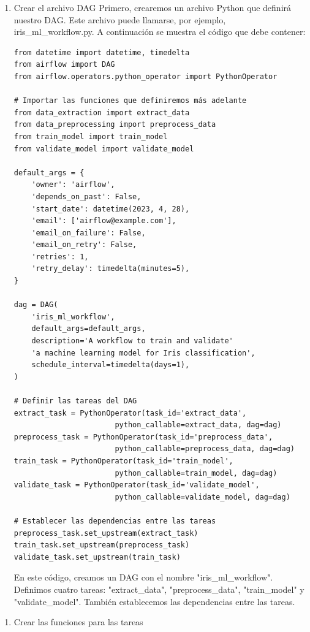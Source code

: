 \documentclass[11pt]{article}
\begin{document}
\begin{enumerate}
\item Crear el archivo DAG
Primero, crearemos un archivo Python que definirá nuestro DAG. Este
archivo puede llamarse, por ejemplo, iris\_ml\_workflow.py. A
continuación se muestra el código que debe contener:
\begin{verbatim}
from datetime import datetime, timedelta
from airflow import DAG
from airflow.operators.python_operator import PythonOperator

# Importar las funciones que definiremos más adelante
from data_extraction import extract_data
from data_preprocessing import preprocess_data
from train_model import train_model
from validate_model import validate_model

default_args = {
    'owner': 'airflow',
    'depends_on_past': False,
    'start_date': datetime(2023, 4, 28),
    'email': ['airflow@example.com'],
    'email_on_failure': False,
    'email_on_retry': False,
    'retries': 1,
    'retry_delay': timedelta(minutes=5),
}

dag = DAG(
    'iris_ml_workflow',
    default_args=default_args,
    description='A workflow to train and validate'
    'a machine learning model for Iris classification',
    schedule_interval=timedelta(days=1),
)

# Definir las tareas del DAG
extract_task = PythonOperator(task_id='extract_data',
                       python_callable=extract_data, dag=dag)
preprocess_task = PythonOperator(task_id='preprocess_data',
                       python_callable=preprocess_data, dag=dag)
train_task = PythonOperator(task_id='train_model',
                       python_callable=train_model, dag=dag)
validate_task = PythonOperator(task_id='validate_model',
                       python_callable=validate_model, dag=dag)

# Establecer las dependencias entre las tareas
preprocess_task.set_upstream(extract_task)
train_task.set_upstream(preprocess_task)
validate_task.set_upstream(train_task)
\end{verbatim}

En este código, creamos un DAG con el nombre
"iris\_ml\_workflow". Definimos cuatro tareas: "extract\_data",
"preprocess\_data", "train\_model" y "validate\_model". También
establecemos las dependencias entre las tareas.
\end{enumerate}


\begin{enumerate}
\item Crear las funciones para las tareas
\end{enumerate}
\end{document}
